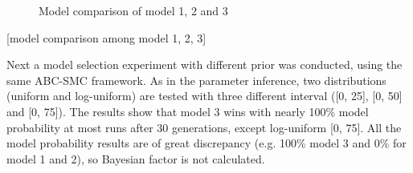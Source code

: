 \documentclass[12pt,a4paper]{report}
\begin{document}
\begin{figure}
    \begin{center}
    \end{center}
    
    \caption{Estimated posterior distribution of parameters in model 3}
    \label{fig:para1}

    \begin{center}
        \end{center}
        
        \caption{Model comparison of model 1, 2 and 3}
        \label{fig:cmp1}
    
\end{figure}

[model comparison among model 1, 2, 3]

Next a model selection experiment with different prior was conducted, using the same ABC-SMC framework. As in the parameter inference, two distributions (uniform and log-uniform) are tested with three different interval ([0, 25], [0, 50] and [0, 75]). The results show that model 3 wins with nearly 100\% model probability at most runs after 30 generations, except log-uniform [0, 75]. All the model probability results are of great discrepancy (e.g. 100\% model 3 and 0\% for model 1 and 2), so Bayesian factor is not calculated. 
\end{document}
